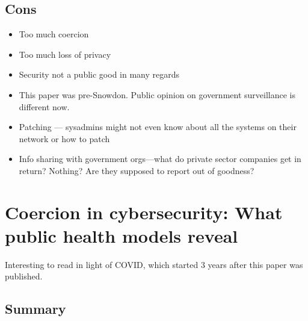 \documentclass[11pt]{article}
\begin{document}
\subsection{Cons}
\begin{itemize}
    \item Too much coercion
    \item Too much loss of privacy
    \item Security not a public good in many regards
    \item This paper was pre-Snowdon. Public opinion on government surveillance is different now. 
    \item Patching --- sysadmins might not even know about all the systems on their network or how to patch
    \item Info sharing with government orgs---what do private sector companies get in return? Nothing? Are they supposed to report out of goodness?
\end{itemize}


\section*{Coercion in cybersecurity: What public health models reveal}

Interesting to read in light of COVID, which started 3 years after this paper was published.


\subsection{Summary}
\end{document}
